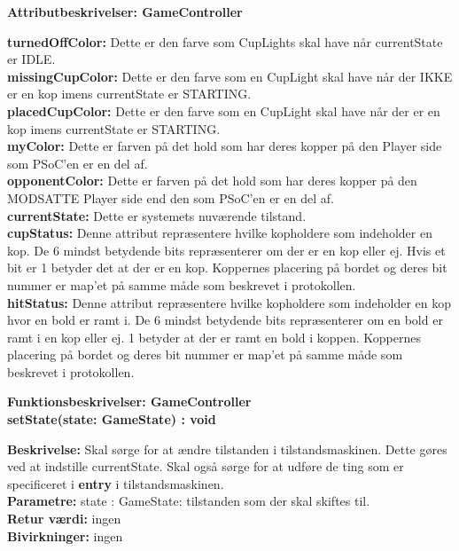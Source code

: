 \documentclass[Arkitektur/System_main.tex]{subfiles}
\begin{document}
{\large\textbf{Attributbeskrivelser: GameController}}
\begin{adjustwidth}{1cm}{0pt}
\textbf{turnedOffColor:} Dette er den farve som CupLights skal have når currentState er IDLE. \\[0.2cm]
\textbf{missingCupColor:} Dette er den farve som en CupLight skal have når der IKKE er en kop imens currentState er STARTING. \\[0.2cm]
\textbf{placedCupColor:} Dette er den farve som en CupLight skal have når der er en kop imens currentState er STARTING. \\[0.2cm]
\textbf{myColor:} Dette er farven på det hold som har deres kopper på den Player side som PSoC'en er en del af.\\[0.2cm]
\textbf{opponentColor:} Dette er farven på det hold som har deres kopper på den MODSATTE Player side end den som PSoC'en er en del af.\\[0.2cm]
\textbf{currentState:} Dette er systemets nuværende tilstand.\\[0.2cm]
\textbf{cupStatus:} Denne attribut repræsentere hvilke kopholdere som indeholder en kop. De 6 mindst betydende bits repræsenterer om der er en kop eller ej. Hvis et bit er 1 betyder det at der er en kop. Koppernes placering på bordet og deres bit nummer er map'et på samme måde som beskrevet i protokollen. \\[0.2cm] 
\textbf{hitStatus:} Denne attribut repræsentere hvilke kopholdere som indeholder en kop hvor en bold er ramt i. De 6 mindst betydende bits repræsenterer om en bold er ramt i en kop eller ej. 1 betyder at der er ramt en bold i koppen. Koppernes placering på bordet og deres bit nummer er map'et på samme måde som beskrevet i protokollen. \\[0.2cm]

\end{adjustwidth}


{\large\textbf{Funktionsbeskrivelser: GameController}}\\[0.2cm]
\textbf{setState(state: GameState) : void}
\begin{adjustwidth}{1cm}{0pt}
\textbf{Beskrivelse:} Skal sørge for at ændre tilstanden i tilstandsmaskinen. Dette gøres ved at indstille currentState. Skal også sørge for at udføre de ting som er specificeret i \textbf{entry} i tilstandsmaskinen. \\[0.2cm]
\textbf{Parametre:} state : GameState: tilstanden som der skal skiftes til. \\[0.2cm]
\textbf{Retur værdi:} ingen \\[0.2cm]
\textbf{Bivirkninger:} ingen \\[0.2cm]
\end{adjustwidth}
\end{document}
